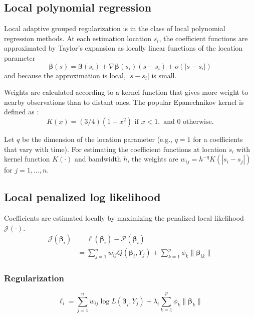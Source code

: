\subsection{Local polynomial regression}
Local adaptive grouped regularization is in the class of local polynomial regression methods. At each estimation location $s_i$, the coefficient functions are approximated by Taylor's expansion as locally linear functions of the location parameter
\begin{equation}
\bm{\beta}(s) = \bm{\beta}(s_i) + \nabla \bm{\beta}(s_i) (s - s_i) + o(|s-s_i|)
\end{equation}
and because the approximation is local, $|s-s_i|$ is small.

Weights are calculated according to a kernel function that gives more weight to nearby observations than to distant ones. The popular Epanechnikov kernel is defined as \citep{Samiuddin-el-Sayyad-1990}:
\begin{equation}
K(x) = (3/4) (1-x^2) \text{ if } x<1, \text{ and } 0 \text{ otherwise}.
\end{equation}

Let $q$ be the dimension of the location parameter (e.g., $q=1$ for a coefficients that vary with time). For estimating the coefficient functions at location $s_i$ with kernel function $K(\cdot)$ and bandwidth $h$, the weights are $w_{ij} = h^{-q} K(|s_i-s_j|)$ for $j = 1, \dots, n$. 

\subsection{Local penalized log likelihood}
Coefficients are estimated locally by maximizing the penalized local likelihood $\mathcal{J}(\cdot)$. 
\begin{align}
\mathcal{J}(\bm{\beta}_i) &= \ell(\bm{\beta}_i) - \mathcal{P}(\bm{\beta}_i) \\
&= \sum_{j=1}^n w_{ij} Q(\bm{\beta}_i, Y_j) + \sum_{k=1}^p \phi_k \| \bm{\beta}_{ik} \|
\end{align}


\subsubsection{Regularization}
\begin{equation}
\ell_i = \sum_{j=1}^n w_{ij} \log{L(\bm{\beta}_i, Y_j)} + \lambda_i \sum_{k=1}^p \phi_k \| \bm{\beta}_k \|
\end{equation}


